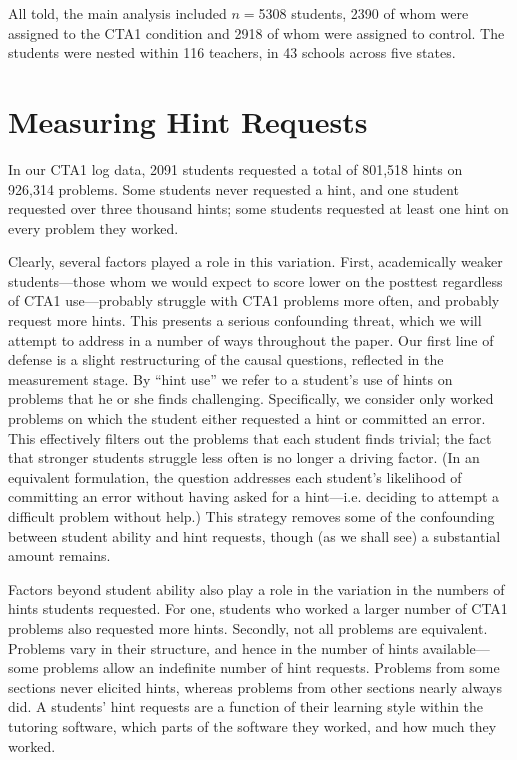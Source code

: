 \documentclass{article}
\begin{document}
All told, the main analysis included $n=$5308 students, 2390 of whom were assigned to the CTA1 condition and 2918 of whom were assigned to control.
The students were nested within 116 teachers, in 43 schools across five states.


\section{Measuring Hint Requests}\label{sec:modelingHints}
In our CTA1 log data, 2091 students requested a total of 801,518 hints on
926,314 problems.
Some students never requested a hint, and one student requested over
three thousand hints; some students requested at least one hint on every problem
they worked.

Clearly, several factors played a role in this variation.
First, academically weaker students---those whom we would expect to
score lower on the posttest regardless of CTA1 use---probably struggle
with CTA1 problems more often, and probably request more hints.
This presents a serious confounding threat, which we will attempt to
address in a number of ways throughout the paper.
Our first line of defense is a slight restructuring of the causal
questions, reflected in the measurement stage.
By ``hint use'' we refer to a student's use of hints on problems that
he or she finds challenging.
Specifically, we consider only worked problems on which
the student either requested a hint or committed an error.
This effectively filters out the problems that each student finds
trivial; the fact that stronger students struggle less often is no
longer a driving factor.
(In an equivalent formulation, the question addresses each student's
likelihood of committing an error without having asked for a
hint---i.e. deciding to attempt a difficult problem without help.)
This strategy removes some of the confounding between
student ability and hint requests, though (as we shall see) a
substantial amount remains.

Factors beyond student ability also play a role in the variation
in the numbers of hints students requested.
For one, students who worked a larger number of CTA1 problems also
requested more hints.
Secondly, not all problems are equivalent.
Problems vary in their structure, and hence in the number of hints
available---some problems allow an indefinite number of hint requests.
Problems from some sections never elicited hints, whereas problems
from other sections nearly always did.
A students' hint requests are a function of their learning
style within the tutoring software, which parts of the software they
worked, and how much they worked.
\end{document}
